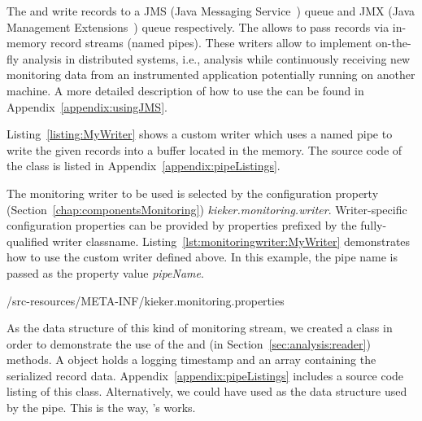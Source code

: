 The  and  write records to a JMS %
(Java Messaging Service~\cite{JMS-WebSite}) queue and JMX (Java Management %
Extensions~\cite{JMX-Website}) queue respectively. The  %
allows to pass records via in-memory record streams (named pipes). %
These writers allow to implement on-the-fly analysis in distributed systems, i.e., analysis while %
continuously receiving new monitoring data from an instrumented application potentially %
running on another machine. A more detailed description of how to use the  %
can be found in Appendix~\ref{appendix:usingJMS}. %

\noindent Listing~\ref{listing:MyWriter} %
shows %
a custom writer  which uses a named pipe to %
write the given records into a buffer located in the memory. The source code of %
the class  is listed in Appendix~\ref{appendix:pipeListings}. %

\setJavaCodeListing



\pagebreak

\noindent The monitoring writer to be used is selected by the %
\KiekerMonitoringPart{} configuration property (Section~\ref{chap:componentsMonitoring}) %
\textit{kieker.monitoring.writer}. Writer-specific configuration properties %
can be provided by properties prefixed by the fully-qualified writer classname.  %
Listing~\ref{lst:monitoringwriter:MyWriter} demonstrates how to use the custom %
writer  defined above. In this example, the pipe name is %
passed as the property value \textit{pipeName}.

\setPropertiesListing
%
{\customComponentsBookstoreApplicationDir/src-resources/META-INF/kieker.monitoring.properties}

\enlargethispage{1cm}

\noindent As the data structure of this kind of monitoring stream, we created a %
class  in order to demonstrate the use of the  and %
 (in Section~\ref{sec:analysis:reader}) methods. %
A  object holds a logging timestamp and an  array %
containing the serialized record data. %
Appendix~\ref{appendix:pipeListings} includes a source code listing of this class. %
Alternatively, we could have used  as the data structure %
used by the pipe. This is the way, \Kieker{}'s  works. %
